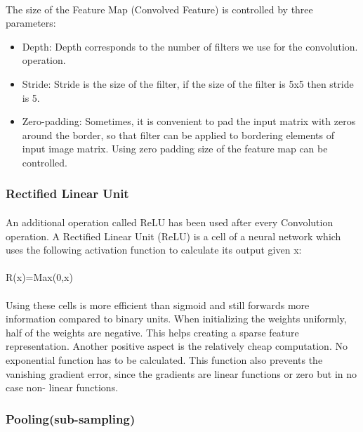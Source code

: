 \documentclass[a4paper,12pt,oneside]{article}
\begin{document}
\paragraph{}
﻿The size of the Feature Map (Convolved Feature) is controlled by three parameters:
\begin{itemize}
	\item Depth: Depth corresponds  to  the  number  of  filters  we use  for  the  convolution.
operation.
	\item ﻿Stride: Stride is the size of the filter, if the size of the filter is 5x5 then stride is 5.
	\item ﻿Zero-padding: Sometimes, it is convenient to pad the input matrix with zeros around
the border, so that filter can be applied to bordering elements of input image matrix.
Using zero padding size of the feature map can be controlled.
\end{itemize}

\subsubsection{Rectified Linear Unit}
\paragraph{}
﻿An additional operation called ReLU has been used after every Convolution operation. A
Rectified Linear Unit (ReLU) is a cell of a neural network which uses the following activation
function to calculate its output given x:
\paragraph{}
R(x)=Max(0,x)
\paragraph{}
﻿Using these cells is more efficient than sigmoid and still forwards more information compared
to binary units. When initializing the weights uniformly, half of the weights are negative. This helps creating a sparse feature representation. Another positive aspect is the relatively cheap
computation. No exponential function has to be calculated. This function also prevents the
vanishing gradient error, since the gradients are linear functions or zero but in no case non-
linear functions.
\vspace{0.5cm}

\subsubsection{Pooling(sub-sampling)}
\end{document}
